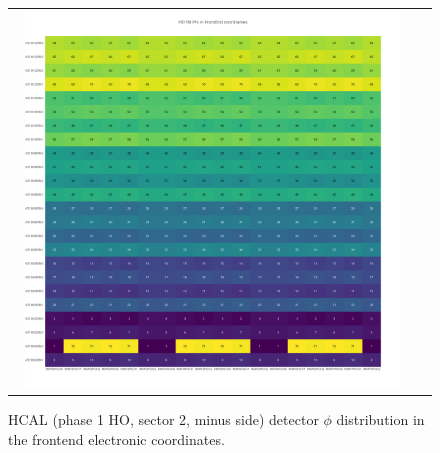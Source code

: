 \begin{figure}[htb]
 \begin{center}
  \begin{tabular}{cc}
   \includegraphics[angle=0,width=0.95\textwidth]{figures/appendix/HO1M_Phi_in_FrontEnd.png}
  \end{tabular}
  \caption{HCAL (phase 1 HO, sector 2, minus side) detector $\phi$ distribution in the frontend electronic coordinates.}
  \label{fig:lmapHO2MPhiFEC}
 \end{center}
\end{figure}
\clearpage

